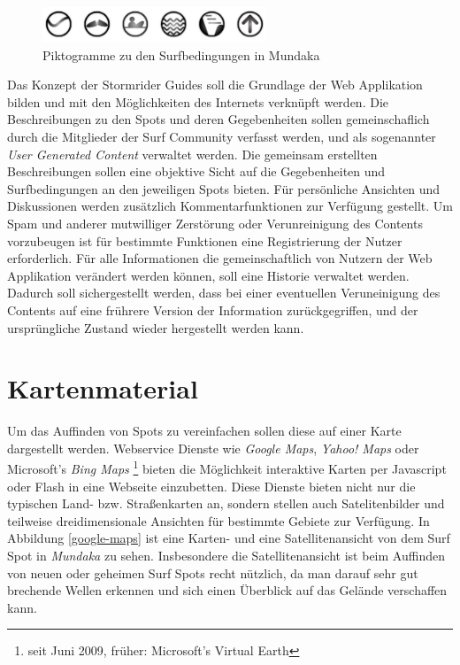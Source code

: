 \begin{figure}[t]
  \begin{center}
    \includegraphics[height=40px]{bilder/mundaka-conditions}
    \caption{Piktogramme zu den Surfbedingungen in Mundaka}
    \label{piktogramm}
  \end{center}
\end{figure}

Das Konzept der Stormrider Guides soll die Grundlage der Web
Applikation bilden und mit den Möglichkeiten des Internets verknüpft
werden. Die Beschreibungen zu den Spots und deren Gegebenheiten sollen
gemeinschaflich durch die Mitglieder der Surf Community verfasst
werden, und als sogenannter \textit{User Generated Content} verwaltet
werden. Die gemeinsam erstellten Beschreibungen sollen eine objektive
Sicht auf die Gegebenheiten und Surfbedingungen an den jeweiligen
Spots bieten. Für persönliche Ansichten und Diskussionen werden
zusätzlich Kommentarfunktionen zur Verfügung gestellt. Um Spam und
anderer mutwilliger Zerstörung oder Verunreinigung des Contents
vorzubeugen ist für bestimmte Funktionen eine Registrierung der Nutzer
erforderlich. Für alle Informationen die gemeinschaftlich von Nutzern
der Web Applikation verändert werden können, soll eine Historie
verwaltet werden. Dadurch soll sichergestellt werden, dass bei einer
eventuellen Veruneinigung des Contents auf eine frührere Version der
Information zurückgegriffen, und der ursprüngliche Zustand wieder
hergestellt werden kann.

\section{Kartenmaterial}

Um das Auffinden von Spots zu vereinfachen sollen diese auf einer
Karte dargestellt werden. Webservice Dienste wie \textit{Google Maps},
\textit{Yahoo! Maps} oder Microsoft's \textit{Bing Maps}
\footnote{seit Juni 2009, früher: Microsoft's Virtual Earth} bieten
die Möglichkeit interaktive Karten per Java\-script oder Flash in eine
Webseite einzubetten. Diese Dienste bieten nicht nur die typischen
Land- bzw. Straßenkarten an, sondern stellen auch Satelitenbilder und
teilweise dreidimensionale Ansichten für bestimmte Gebiete zur
Verfügung. In Abbildung \ref{google-maps} ist eine Karten- und eine
Satellitenansicht von dem Surf Spot in \textit{Mundaka} zu
sehen. Insbesondere die Satellitenansicht ist beim Auffinden von neuen
oder geheimen Surf Spots recht nützlich, da man darauf sehr gut
brechende Wellen erkennen und sich einen Überblick auf das Gelände
verschaffen kann.

